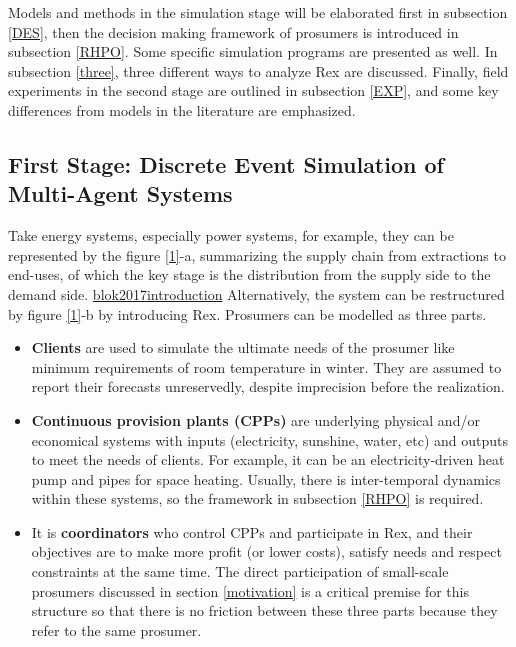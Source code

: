 \documentclass[letterpaper,8pt,twocolumn,twoside,]{pinp}
\providecommand{\tightlist}{%
  \setlength{\itemsep}{0pt}\setlength{\parskip}{0pt}}
\begin{document}
\label{method}

Models and methods in the simulation stage will be elaborated first in
subsection \ref{DES}, then the decision making framework of prosumers is
introduced in subsection \ref{RHPO}. Some specific simulation programs
are presented as well. In subsection \ref{three}, three different ways
to analyze Rex are discussed. Finally, field experiments in the second
stage are outlined in subsection \ref{EXP}, and some key differences
from models in the literature are emphasized.

\hypertarget{first-stage-discrete-event-simulation-of-multi-agent-systems}{%
\subsection{First Stage: Discrete Event Simulation of Multi-Agent
Systems}\label{first-stage-discrete-event-simulation-of-multi-agent-systems}}

\label{DES}

Take energy systems, especially power systems, for example, they can be
represented by the figure \ref{1}-a, summarizing the supply chain from
extractions to end-uses, of which the key stage is the distribution from
the supply side to the demand side.
\protect\hyperlink{reference}{blok2017introduction} Alternatively, the
system can be restructured by figure \ref{1}-b by introducing Rex.
Prosumers can be modelled as three parts.

\begin{itemize}
\tightlist
\item
  \textbf{Clients} are used to simulate the ultimate needs of the
  prosumer like minimum requirements of room temperature in winter. They
  are assumed to report their forecasts unreservedly, despite
  imprecision before the realization.
\item
  \textbf{Continuous provision plants (CPPs)} are underlying physical
  and/or economical systems with inputs (electricity, sunshine, water,
  etc) and outputs to meet the needs of clients. For example, it can be
  an electricity-driven heat pump and pipes for space heating. Usually,
  there is inter-temporal dynamics within these systems, so the
  framework in subsection \ref{RHPO} is required.
\item
  It is \textbf{coordinators} who control CPPs and participate in Rex,
  and their objectives are to make more profit (or lower costs), satisfy
  needs and respect constraints at the same time. The direct
  participation of small-scale prosumers discussed in section
  \ref{motivation} is a critical premise for this structure so that
  there is no friction between these three parts because they refer to
  the same prosumer.
\end{itemize}
\end{document}

